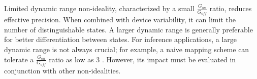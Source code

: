 



\noindent Limited dynamic range non-ideality, characterized by a small $\frac{G_{on}}{G_{off}}$ ratio, reduces effective precision. When combined with device variability, it can limit the number of distinguishable states. A larger dynamic range is generally preferable for better differentiation between states. For inference applications, a large dynamic range is not always crucial; for example, a naive mapping scheme can tolerate a $\frac{G_{on}}{G_{off}}$ ratio as low as 3 \cite{mehonic2019simulation}. However, its impact must be evaluated in conjunction with other non-idealities.\\

